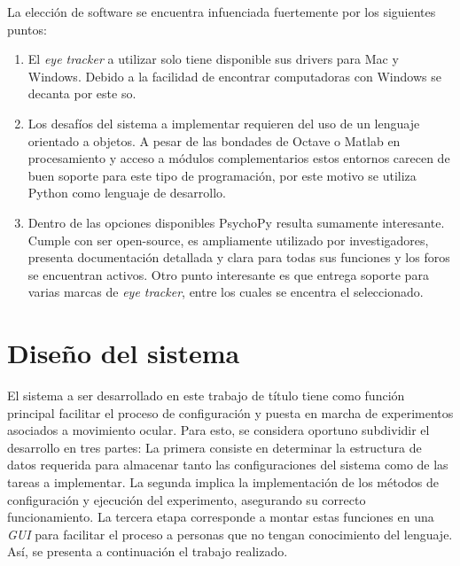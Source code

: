 \documentclass[\main/main.tex]{subfiles}
\begin{document}
		\newpage
		La elección de software se encuentra infuenciada fuertemente por los siguientes puntos:
		\begin{enumerate}\setlength\itemsep{-0.5em}
			\item El \textit{eye tracker} a utilizar solo tiene disponible sus drivers para Mac y Windows. Debido a la facilidad de encontrar computadoras con Windows se decanta por este \acrshort{so}.

			\item Los desafíos del sistema a implementar requieren del uso de un lenguaje orientado a objetos. A pesar de las bondades de Octave o Matlab en procesamiento y acceso a módulos complementarios estos entornos carecen de buen soporte para este tipo de programación, por este motivo se utiliza Python como lenguaje de desarrollo. 

			\item Dentro de las opciones disponibles PsychoPy resulta sumamente interesante. Cumple con ser open-source, es ampliamente utilizado por investigadores, presenta documentación detallada y clara para todas sus funciones y los foros se encuentran activos. Otro punto interesante es que entrega soporte para varias marcas de \textit{eye tracker}, entre los cuales se encentra el seleccionado.

		\end{enumerate}

	\section{Diseño del sistema}
	\label{sec:03_diseño_sistema}
		El sistema a ser desarrollado en este trabajo de título tiene como función principal facilitar el proceso de configuración y puesta en marcha de experimentos asociados a movimiento ocular. Para esto, se considera oportuno subdividir el desarrollo en tres partes: La primera consiste en determinar la estructura de datos requerida para almacenar tanto las configuraciones del sistema como de las tareas a implementar. La segunda implica la implementación de los métodos de configuración y ejecución del experimento, asegurando su correcto funcionamiento. La tercera etapa corresponde a montar estas funciones en una \textit{GUI} para facilitar el proceso a personas que no tengan conocimiento del lenguaje. Así, se presenta a continuación el trabajo realizado.
\end{document}
